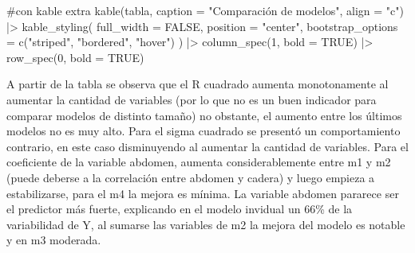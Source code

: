 \documentclass[
  letterpaper,
  DIV=11,
  numbers=noendperiod]{scrartcl}
\newenvironment{Shaded}{\begin{snugshade}}{\end{snugshade}}
\newcommand{\AttributeTok}[1]{\textcolor[rgb]{0.40,0.45,0.13}{#1}}
\newcommand{\CommentTok}[1]{\textcolor[rgb]{0.37,0.37,0.37}{#1}}
\newcommand{\ConstantTok}[1]{\textcolor[rgb]{0.56,0.35,0.01}{#1}}
\newcommand{\DecValTok}[1]{\textcolor[rgb]{0.68,0.00,0.00}{#1}}
\newcommand{\FunctionTok}[1]{\textcolor[rgb]{0.28,0.35,0.67}{#1}}
\newcommand{\NormalTok}[1]{\textcolor[rgb]{0.00,0.23,0.31}{#1}}
\newcommand{\SpecialCharTok}[1]{\textcolor[rgb]{0.37,0.37,0.37}{#1}}
\newcommand{\StringTok}[1]{\textcolor[rgb]{0.13,0.47,0.30}{#1}}
\begin{document}
\begin{Shaded}
\begin{Highlighting}[]
\CommentTok{\#con kable extra}
\FunctionTok{kable}\NormalTok{(tabla, }\AttributeTok{caption =} \StringTok{"Comparación de modelos"}\NormalTok{, }\AttributeTok{align =} \StringTok{"c"}\NormalTok{) }\SpecialCharTok{|\textgreater{}} 
  \FunctionTok{kable\_styling}\NormalTok{(}
    \AttributeTok{full\_width =} \ConstantTok{FALSE}\NormalTok{,}
    \AttributeTok{position =} \StringTok{"center"}\NormalTok{,}
    \AttributeTok{bootstrap\_options =} \FunctionTok{c}\NormalTok{(}\StringTok{"striped"}\NormalTok{, }\StringTok{"bordered"}\NormalTok{, }\StringTok{"hover"}\NormalTok{)}
\NormalTok{  ) }\SpecialCharTok{|\textgreater{}} 
  \FunctionTok{column\_spec}\NormalTok{(}\DecValTok{1}\NormalTok{, }\AttributeTok{bold =} \ConstantTok{TRUE}\NormalTok{) }\SpecialCharTok{|\textgreater{}} 
  \FunctionTok{row\_spec}\NormalTok{(}\DecValTok{0}\NormalTok{, }\AttributeTok{bold =} \ConstantTok{TRUE}\NormalTok{)}
\end{Highlighting}
\end{Shaded}

A partir de la tabla se observa que el R cuadrado aumenta monotonamente
al aumentar la cantidad de variables (por lo que no es un buen indicador
para comparar modelos de distinto tamaño) no obstante, el aumento entre
los últimos modelos no es muy alto. Para el sigma cuadrado se presentó
un comportamiento contrario, en este caso disminuyendo al aumentar la
cantidad de variables. Para el coeficiente de la variable abdomen,
aumenta considerablemente entre m1 y m2 (puede deberse a la correlación
entre abdomen y cadera) y luego empieza a estabilizarse, para el m4 la
mejora es mínima. La variable abdomen pararece ser el predictor más
fuerte, explicando en el modelo invidual un 66\% de la variabilidad de
Y, al sumarse las variables de m2 la mejora del modelo es notable y en
m3 moderada.
\end{document}
